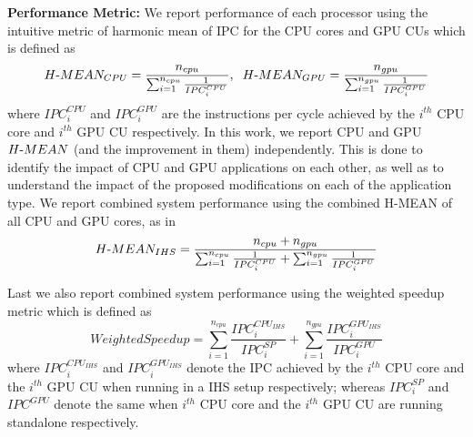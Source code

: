 \par \textbf{Performance Metric:} We report performance of each processor using the intuitive metric of harmonic mean of IPC for the CPU cores and GPU CUs which is defined as 
{\small
\begin{equation*}
H\textnormal{-}MEAN_{CPU} = \frac{n_{cpu}}{\sum_{i=1}^{n_{cpu}} \frac{1}{IPC_{i}^{CPU}}}, \hspace{0.2cm} H\textnormal{-}MEAN_{GPU} = \frac{n_{gpu}}{\sum_{i=1}^{n_{gpu}} \frac{1}{IPC_{i}^{GPU}}} 
\end{equation*}
}
where $IPC_i^{CPU}$ and $IPC_i^{GPU}$ are the instructions per cycle achieved by the $i^{th}$ CPU core and $i^{th}$ GPU CU respectively.
In this work, we report CPU and GPU $H\textnormal{-}MEAN$ (and the improvement in them) independently. This is done to identify the impact of CPU and GPU applications on each other, as well as to understand the impact of the proposed modifications on each of the application type. We report combined system performance using the combined H-MEAN of all CPU and GPU cores, as in 
{\small
\begin{equation*}
H\textnormal{-}MEAN_{IHS} = \frac{n_{cpu}+ n_{gpu}}{\sum_{i=1}^{n_{cpu}} \frac{1}{IPC_{i}^{CPU}} + \sum_{i=1}^{n_{gpu}} \frac{1}{IPC_{i}^{GPU}}} 
\end{equation*}
}
\par Last we also report combined system performance using the weighted speedup metric \cite{weighted-speedup} which is defined as
{\small
\begin{equation*}
Weighted Speedup = \sum_{i=1}^{n_{cpu}} \frac{IPC_i^{CPU_{IHS}}}{IPC_i^{SP}} + \sum_{i=1}^{n_{gpu}} \frac{IPC_i^{GPU_{IHS}}}{IPC_i^{GPU}}
\end{equation*}
}
where ${IPC_i^{CPU_{IHS}}}$ and $IPC_i^{GPU_{IHS}}$ denote the IPC achieved by the $i^{th}$ CPU core and the $i^{th}$ GPU CU when running in a IHS setup respectively; whereas $IPC_i^{SP}$ and $IPC^{GPU}$ denote the same when $i^{th}$ CPU core and the $i^{th}$ GPU CU are running standalone respectively. 
